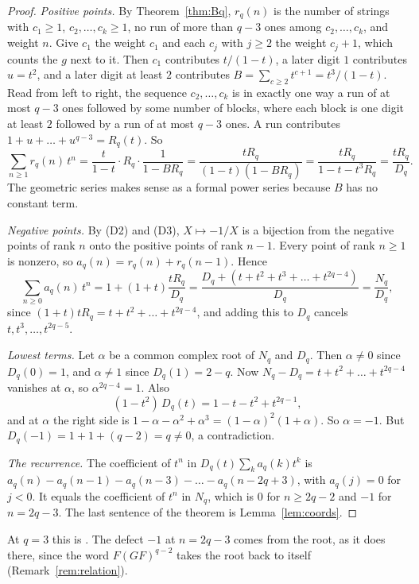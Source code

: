 \begin{proof}
\emph{Positive points.} By Theorem~\ref{thm:Bq}, $r_q(n)$ is the number of strings with $c_1\ge1$,
$c_2,\dots,c_k\ge1$, no run of more than $q-3$ ones among $c_2,\dots,c_k$, and weight $n$. Give $c_1$
the weight $c_1$ and each $c_j$ with $j\ge2$ the weight $c_j+1$, which counts the $g$ next to it. Then
$c_1$ contributes $t/(1-t)$, a later digit $1$ contributes $u=t^2$, and a later digit at least $2$
contributes $B=\sum_{c\ge2}t^{c+1}=t^3/(1-t)$. Read from left to right, the sequence $c_2,\dots,c_k$ is
in exactly one way a run of at most $q-3$ ones followed by some number of blocks, where each block is
one digit at least $2$ followed by a run of at most $q-3$ ones. A run contributes
$1+u+\dots+u^{q-3}=R_q(t)$. So
\[
\sum_{n\ge1}r_q(n)\,t^n=\frac{t}{1-t}\cdot R_q\cdot\frac{1}{1-BR_q}=\frac{tR_q}{(1-t)(1-BR_q)}=\frac{tR_q}{1-t-t^3R_q}
=\frac{tR_q}{D_q}.
\]
The geometric series makes sense as a formal power series because $B$ has no constant term.

\emph{Negative points.} By (D2) and (D3), $X\mapsto-1/X$ is a bijection from the negative points of
rank $n$ onto the positive points of rank $n-1$. Every point of rank $n\ge1$ is nonzero, so
$a_q(n)=r_q(n)+r_q(n-1)$. Hence
\[
\sum_{n\ge0}a_q(n)\,t^n=1+(1+t)\frac{tR_q}{D_q}=\frac{D_q+(t+t^2+t^3+\dots+t^{2q-4})}{D_q}=\frac{N_q}{D_q},
\]
since $(1+t)tR_q=t+t^2+\dots+t^{2q-4}$, and adding this to $D_q$ cancels $t,t^3,\dots,t^{2q-5}$.

\emph{Lowest terms.} Let $\alpha$ be a common complex root of $N_q$ and $D_q$. Then $\alpha\neq0$ since
$D_q(0)=1$, and $\alpha\neq1$ since $D_q(1)=2-q$. Now $N_q-D_q=t+t^2+\dots+t^{2q-4}$ vanishes at
$\alpha$, so $\alpha^{2q-4}=1$. Also
\[
(1-t^2)\,D_q(t)=1-t-t^2+t^{2q-1},
\]
and at $\alpha$ the right side is $1-\alpha-\alpha^2+\alpha^3=(1-\alpha)^2(1+\alpha)$. So $\alpha=-1$.
But $D_q(-1)=1+1+(q-2)=q\neq0$, a contradiction.

\emph{The recurrence.} The coefficient of $t^n$ in $D_q(t)\sum_k a_q(k)t^k$ is
$a_q(n)-a_q(n-1)-a_q(n-3)-\dots-a_q(n-2q+3)$, with $a_q(j)=0$ for $j<0$. It equals the coefficient
of $t^n$ in $N_q$, which is $0$ for $n\ge2q-2$ and $-1$ for $n=2q-3$. The last sentence of the
theorem is Lemma~\ref{lem:coords}.
\end{proof}

At $q=3$ this is \cite[Theorem~5.1]{P137}. The defect $-1$ at $n=2q-3$ comes from the root, as it does
there, since the word $F(GF)^{q-2}$ takes the root back to itself (Remark~\ref{rem:relation}).

